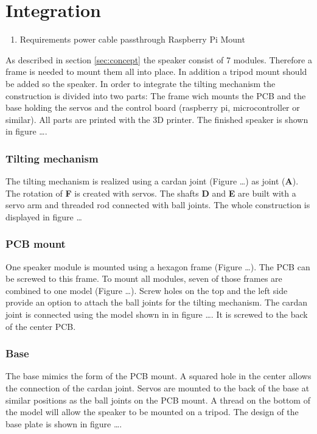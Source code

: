 \section{Integration}

\begin{enumerate}
  \item Requirements
  \subitem power cable passthrough
  \subitem Raspberry Pi Mount
\end{enumerate}

As described in section \ref{sec:concept} the speaker consist of 7 modules. Therefore a frame is needed to mount them all into place. In addition a tripod mount should be added so the speaker. In order to integrate the tilting mechanism the construction is divided into two parts: The frame wich mounts the PCB and the base holding the servos and the control board (raspberry pi, microcontroller or similar). All parts are printed with the 3D printer. The finished speaker is shown in figure \dots.

\subsubsection*{Tilting mechanism}

The tilting mechanism is realized using a cardan joint (Figure \dots) as joint (\textbf{A}). The rotation of \textbf{F} is created with servos. The shafts \textbf{D} and \textbf{E} are built with a servo arm and threaded rod connected with ball joints. The whole construction is displayed in figure \dots

\subsubsection*{PCB mount}

One speaker module is mounted using a hexagon frame (Figure \dots). The PCB can be screwed to this frame. To mount all modules, seven of those frames are combined to one model (Figure \dots). Screw holes on the top and the left side provide an option to attach the ball joints for the tilting mechanism. The cardan joint is connected using the model shown in in figure \dots. It is screwed to the back of the center PCB.

\subsubsection*{Base}

The base mimics the form of the PCB mount. A squared hole in the center allows the connection of the cardan joint. Servos are mounted to the back of the base at similar positions as the ball joints on the PCB mount. A thread on the bottom of the model will allow the speaker to be mounted on a tripod. The design of the base plate is shown in figure \dots.